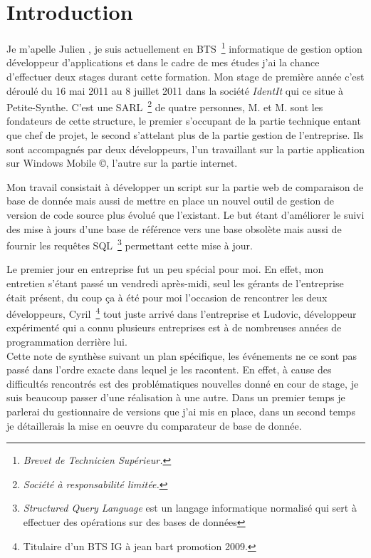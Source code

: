 \chapter{Introduction}

Je m'apelle Julien , je suis actuellement en BTS\,
\footnote{\emph{Brevet de Technicien Supérieur.}} informatique de gestion option
développeur d'applications et dans le cadre de mes études j'ai la chance
d'effectuer deux stages durant cette formation. Mon stage de première année
c'est déroulé du 16 mai 2011 au 8 juillet 2011 dans la société \emph{IdentIt}
qui ce situe à Petite-Synthe. C'est une SARL\, \footnote{\emph{Société à
responsabilité limitée.}} de quatre personnes, M. et M.
sont les fondateurs de cette structure, le premier s'occupant de la partie
technique entant que chef de projet, le second s'attelant plus de la partie
gestion de l'entreprise. Ils sont accompagnés par deux développeurs, l'un
travaillant sur la partie application sur Windows Mobile \copyright, l'autre
sur la partie internet.

Mon travail consistait à développer un script sur la partie web de comparaison
de base de donnée mais aussi de mettre en place un nouvel outil de gestion de
version de code source plus évolué que l'existant. Le but étant d'améliorer le
suivi des mise à jours d'une base de référence vers une base obsolète mais
aussi de fournir les requêtes SQL\, \footnote{\emph{Structured Query Language}
est un langage informatique normalisé qui sert à effectuer des opérations sur
des bases de données} permettant cette mise à jour.

Le premier jour en entreprise fut un peu spécial pour moi. En effet, mon
entretien s'étant passé un vendredi après-midi, seul les gérants de
l'entreprise était présent, du coup ça à été pour moi l'occasion de rencontrer
les deux développeurs, Cyril\, \footnote{Titulaire d'un BTS IG à jean bart
promotion 2009.} tout juste arrivé dans l'entreprise et Ludovic, développeur
expérimenté qui a connu plusieurs entreprises est à de nombreuses années de
programmation derrière lui.\\ Cette note de synthèse suivant un plan
spécifique, les événements ne ce sont pas passé dans l'ordre exacte dans lequel
je les racontent. En effet, à cause des difficultés rencontrés est des
problématiques nouvelles donné en cour de stage, je suis beaucoup passer d'une
réalisation à une autre.  Dans un premier temps je parlerai du gestionnaire de
versions que j'ai mis en place, dans un second temps je détaillerais la mise en
oeuvre du comparateur de base de donnée.

\clearpage
